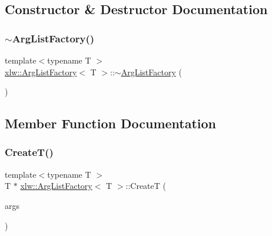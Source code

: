 \subsection{Constructor \& Destructor Documentation}
\hypertarget{classxlw_1_1ArgListFactory_a5f919feedf0ee38addb2ad97a20c9c50}{}\label{classxlw_1_1ArgListFactory_a5f919feedf0ee38addb2ad97a20c9c50} 
\subsubsection{\texorpdfstring{$\sim$\+Arg\+List\+Factory()}{~ArgListFactory()}}
{\footnotesize\ttfamily template$<$typename T $>$ \\
\hyperlink{classxlw_1_1ArgListFactory}{xlw\+::\+Arg\+List\+Factory}$<$ T $>$\+::$\sim$\hyperlink{classxlw_1_1ArgListFactory}{Arg\+List\+Factory} (\begin{DoxyParamCaption}{ }\end{DoxyParamCaption})\hspace{0.3cm}{\ttfamily [inline]}}



\subsection{Member Function Documentation}
\hypertarget{classxlw_1_1ArgListFactory_a42e5fdbde035d3ab8bd383a0f32bc35f}{}\label{classxlw_1_1ArgListFactory_a42e5fdbde035d3ab8bd383a0f32bc35f} 
\subsubsection{\texorpdfstring{Create\+T()}{CreateT()}}
{\footnotesize\ttfamily template$<$typename T $>$ \\
T $\ast$ \hyperlink{classxlw_1_1ArgListFactory}{xlw\+::\+Arg\+List\+Factory}$<$ T $>$\+::CreateT (\begin{DoxyParamCaption}\item[{Argument\+List}]{args }\end{DoxyParamCaption})}

\hypertarget{classxlw_1_1ArgListFactory_a5d81eab40e16198ecf994f6404792550}{}\label{classxlw_1_1ArgListFactory_a5d81eab40e16198ecf994f6404792550} 
